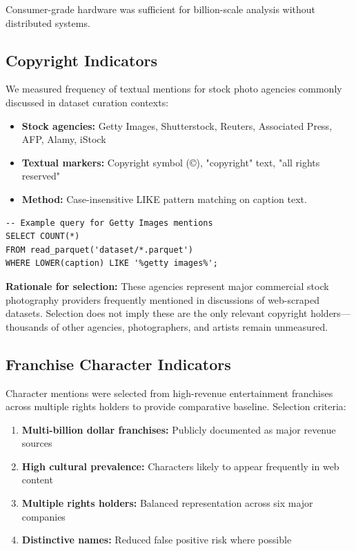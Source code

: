 \documentclass[11pt]{article}
\begin{document}
Consumer-grade hardware was sufficient for billion-scale analysis without distributed systems.

\subsection{Copyright Indicators}
We measured frequency of textual mentions for stock photo agencies commonly discussed in dataset curation contexts:

\begin{itemize}

\item \textbf{Stock agencies:} Getty Images, Shutterstock, Reuters, Associated Press, AFP, Alamy, iStock

\item \textbf{Textual markers:} Copyright symbol (©), "copyright" text, "all rights reserved"

\item \textbf{Method:} Case-insensitive LIKE pattern matching on caption text. 

\end{itemize}

\begin{lstlisting}
-- Example query for Getty Images mentions
SELECT COUNT(*) 
FROM read_parquet('dataset/*.parquet')
WHERE LOWER(caption) LIKE '%getty images%';
\end{lstlisting}

\textbf{Rationale for selection:} These agencies represent major commercial stock photography providers frequently mentioned in discussions of web-scraped datasets. Selection does not imply these are the only relevant copyright holders—thousands of other agencies, photographers, and artists remain unmeasured.


\subsection{Franchise Character Indicators}
Character mentions were selected from high-revenue entertainment franchises across multiple rights holders to provide comparative baseline. Selection criteria:

\begin{enumerate} \item \textbf{Multi-billion dollar franchises:} Publicly documented as major revenue sources
\item \textbf{High cultural prevalence:} Characters likely to appear frequently in web content
\item \textbf{Multiple rights holders:} Balanced representation across six major companies
\item \textbf{Distinctive names:} Reduced false positive risk where possible

\end{enumerate}
\end{document}
